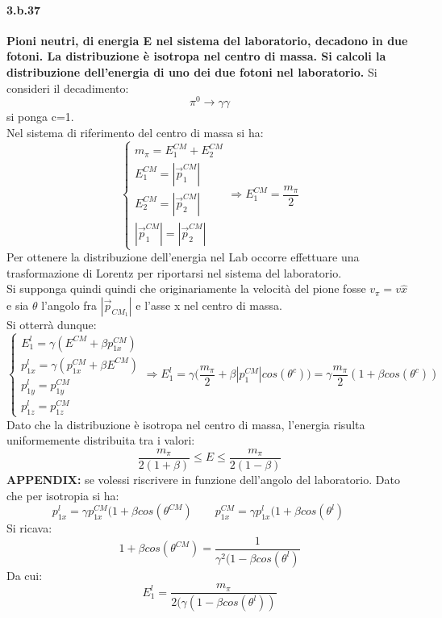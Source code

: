 \documentclass[twoside]{article}
\begin{document}
\paragraph{3.b.37}\textbf{Pioni neutri, di energia E nel sistema del laboratorio, decadono in due fotoni. La distribuzione è isotropa nel centro di massa. Si calcoli la distribuzione dell’energia di uno dei due fotoni nel laboratorio.}
Si consideri il decadimento:
\begin{equation}
    \pi^0\to \gamma\gamma
\end{equation}
si ponga c=1.\\
Nel sistema di riferimento del centro di massa si ha:
\begin{equation}
    \begin{cases}
    m_\pi=E_1^{CM}+E_2^{CM}\\
    E_1^{CM}=|\vec{p}_1^{CM}|\\
    E_2^{CM}=|\vec{p}_2^{CM}|\\
    |\vec{p}_1^{CM}|=|\vec{p}_2^{CM}|
    \end{cases}\Longrightarrow E_1^{CM}=\frac{m_\pi}{2}
\end{equation}
Per ottenere la distribuzione dell'energia nel Lab occorre effettuare una trasformazione di Lorentz per riportarsi nel sistema del laboratorio.\\
Si supponga quindi quindi che originariamente la velocità del pione fosse $v_{\pi}=v\hat{x}$ e sia $\theta$ l'angolo fra $|\vec{p}_{{CM}_1}|$ e l'asse x nel centro di massa.\\
Si otterrà dunque:
\begin{equation}
\begin{cases}
     E_1^l=\gamma(E^{CM}+\beta p_{1x}^{CM})\\
     p_{1x}^l=\gamma(p_{1x}^{CM}+\beta E^{CM})\\
     p_{1y}^l=p_{1y}^{CM}\\
     p_{1z}^l=p_{1z}^{CM}
\end{cases}\Longrightarrow
     E_1^l=\gamma\biggl(\frac{m_\pi}{2}+\beta |p^{CM}_1|cos(\theta^c)\biggr)=\gamma\frac{m_\pi}{2}(1+\beta cos(\theta^c))
\end{equation}
Dato che la distribuzione è isotropa nel centro di massa, l'energia risulta uniformemente distribuita tra i valori:
\begin{equation}
    \frac{m_\pi}{2(1+\beta)}\le E\le \frac{m_\pi}{2(1-\beta)}
\end{equation}
\textbf{APPENDIX:} se volessi riscrivere in funzione dell'angolo del laboratorio.
Dato che per isotropia si ha:
\begin{equation}
    p_{1x}^l=\gamma p_{1x}^{CM}(1+\beta cos(\theta^{CM}) \qquad p_{1x}^{CM}=\gamma p_{1x}^{l}(1+\beta cos(\theta^{l}) \qquad
\end{equation}
Si ricava:
\begin{equation}
    1+\beta cos(\theta^{CM})=\frac{1}{\gamma^2(1-\beta cos(\theta^l)}
\end{equation}
Da cui:
\begin{equation}
    E^l_1=\frac{m_\pi}{2(\gamma(1-\beta cos(\theta^l))}
\end{equation}
\end{document}
